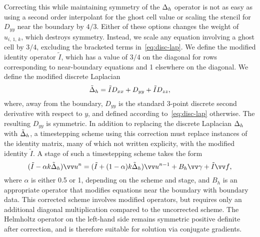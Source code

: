 Correcting this while maintaining symmetry of the $\Delta_h$ operator is not as easy
as using a second order interpolant for the ghost cell value or scaling the stencil for
$D_{yy}$ near the boundary by $4/3$. Either of these options changes the weight of
$u_{i,\,1,\,k}$, which destroys symmetry. Instead, we scale any equation involving a
ghost cell by $3/4$, excluding the bracketed terms in~\eqref{eq:disc-lap}. We define the
modified identity operator $\tilde{I}$, which has a value of $3/4$ on the diagonal for
rows corresponding to near-boundary equations and 1 elsewhere on the diagonal. We define
the modified discrete Laplacian
\begin{equation}\label{eq:mod-disc-lap}
    \tilde{\Delta}_h = \tilde{I}D_{xx} + D_{yy} + \tilde{I}D_{zz},
\end{equation}
where, away from the boundary, $D_{yy}$ is the standard 3-point discrete second
derivative with respect to $y$, and defined according to~\eqref{eq:disc-lap} otherwise.
The resulting $D_{yy}$ is symmetric. In addition to replacing the discrete Laplacian
$\Delta_h$ with $\tilde{\Delta}_h$, a timestepping scheme using this correction
must replace instances of the identity matrix, many of which not written explicity, with
the modified identity $\tilde{I}$. A stage of such a timestepping scheme takes the form
\begin{equation*}
    (\tilde{I} - \alpha k\tilde{\laplacian}_h)\arr{u}^n = (\tilde{I} + (1-\alpha)k\tilde{\laplacian}_h)\arr{u}^{n-1} + B_h\arr{\gamma} + \tilde{I}\arr{f},
\end{equation*}
where $\alpha$ is either 0.5 or 1, depending on the scheme and stage, and $B_h$ is an
appropriate operator that modifies equations near the boundary with boundary data. This
corrected scheme involves modified operators, but requires only an additional diagonal
multiplication compared to the uncorrected scheme. The Helmholtz operator on the
left-hand side remains symmetric positive definite after correction, and is therefore
suitable for solution via conjugate gradients.

